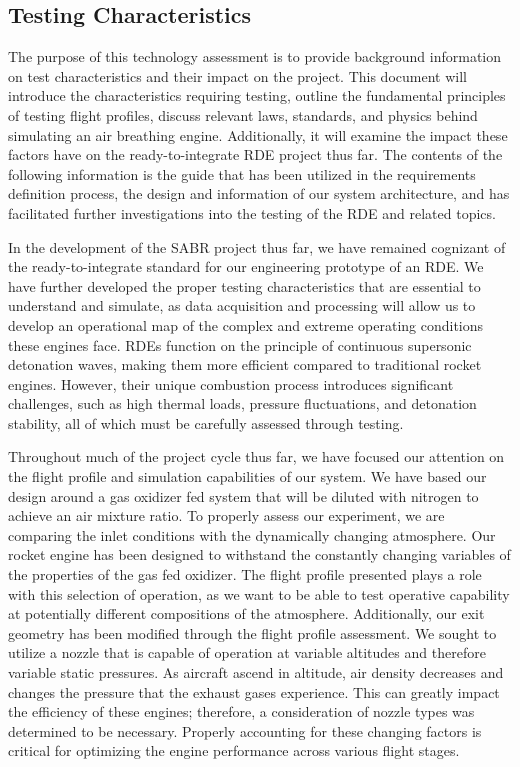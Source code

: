 \subsection{Testing Characteristics}

The purpose of this technology assessment is to provide background information on test characteristics and their impact on the project. This document will introduce the characteristics requiring testing, outline the fundamental principles of testing flight profiles, discuss relevant laws, standards, and physics behind simulating an air breathing engine. Additionally, it will examine the impact these factors have on the ready-to-integrate RDE project thus far. The contents of the following information is the guide that has been utilized in the requirements definition process, the design and information of our system architecture, and has facilitated further investigations into the testing of the RDE and related topics.

In the development of the SABR project thus far, we have remained cognizant of the ready-to-integrate standard for our engineering prototype of an RDE. We have further developed the proper testing characteristics that are essential to understand and simulate, as data acquisition and processing will allow us to develop an operational map of the complex and extreme operating conditions these engines face. RDEs function on the principle of continuous supersonic detonation waves, making them more efficient compared to traditional rocket engines. However, their unique combustion process introduces significant challenges, such as high thermal loads, pressure fluctuations, and detonation stability, all of which must be carefully assessed through testing.

Throughout much of the project cycle thus far, we have focused our attention on the flight profile and simulation capabilities of our system. We have based our design around a gas oxidizer fed system that will be diluted with nitrogen to achieve an air mixture ratio. To properly assess our experiment, we are comparing the inlet conditions with the dynamically changing atmosphere. Our rocket engine has been designed to withstand the constantly changing variables of the properties of the gas fed oxidizer. The flight profile presented plays a role with this selection of operation, as we want to be able to test operative capability at potentially different compositions of the atmosphere. Additionally, our exit geometry has been modified through the flight profile assessment. We sought to utilize a nozzle that is capable of operation at variable altitudes and therefore variable static pressures. As aircraft ascend in altitude, air density decreases and changes the pressure that the exhaust gases experience. This can greatly impact the efficiency of these engines; therefore, a consideration of nozzle types was determined to be necessary. Properly accounting for these changing factors is critical for optimizing the engine performance across various flight stages.